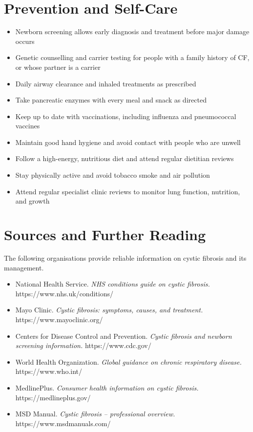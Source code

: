 \section*{Prevention and Self-Care}
\begin{itemize}
    \item Newborn screening allows early diagnosis and treatment before major damage occurs
    \item Genetic counselling and carrier testing for people with a family history of CF, or whose partner is a carrier
    \item Daily airway clearance and inhaled treatments as prescribed
    \item Take pancreatic enzymes with every meal and snack as directed
    \item Keep up to date with vaccinations, including influenza and pneumococcal vaccines
    \item Maintain good hand hygiene and avoid contact with people who are unwell
    \item Follow a high-energy, nutritious diet and attend regular dietitian reviews
    \item Stay physically active and avoid tobacco smoke and air pollution
    \item Attend regular specialist clinic reviews to monitor lung function, nutrition, and growth
\end{itemize}

\section*{Sources and Further Reading}
The following organisations provide reliable information on cystic fibrosis and its management.

\begin{itemize}
    \item National Health Service. \textit{NHS conditions guide on cystic fibrosis.} https://www.nhs.uk/conditions/
    \item Mayo Clinic. \textit{Cystic fibrosis: symptoms, causes, and treatment.} https://www.mayoclinic.org/
    \item Centers for Disease Control and Prevention. \textit{Cystic fibrosis and newborn screening information.} https://www.cdc.gov/
    \item World Health Organization. \textit{Global guidance on chronic respiratory disease.} https://www.who.int/
    \item MedlinePlus. \textit{Consumer health information on cystic fibrosis.} https://medlineplus.gov/
    \item MSD Manual. \textit{Cystic fibrosis -- professional overview.} https://www.msdmanuals.com/
\end{itemize}
